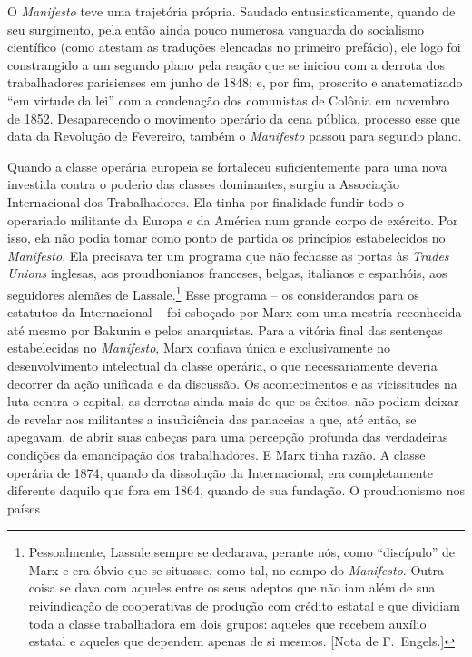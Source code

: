  O \textit{Manifesto} teve uma trajetória própria. Saudado
entusiasticamente, quando de seu surgimento, pela então ainda pouco
numerosa vanguarda do socialismo científico (como atestam as traduções
elencadas no primeiro prefácio), ele logo foi constrangido a um segundo
plano pela reação que se iniciou com a derrota dos trabalhadores
parisienses em junho de 1848; e, por fim, proscrito e anatematizado “em
virtude da lei” com a condenação dos comunistas de Colônia em novembro
de 1852. Desaparecendo o movimento operário da cena pública, processo
esse que data da Revolução de Fevereiro, também o \textit{Manifesto}
passou para segundo plano.

 Quando a classe operária europeia se fortaleceu suficientemente para
uma nova investida contra o poderio das classes dominantes, surgiu a
Associação Internacional dos Trabalhadores. Ela tinha por finalidade
fundir todo o operariado militante da Europa e da América num grande
corpo de exército. Por isso, ela não podia tomar como ponto de partida
os princípios estabelecidos no \textit{Manifesto}. Ela precisava ter um
programa que não fechasse as portas às \textit{Trades Unions} inglesas,
aos proudhonianos franceses, belgas, italianos e espanhóis, aos
seguidores alemães de Lassale.\footnote{ Pessoalmente, Lassale sempre se
declarava, perante nós, como “discípulo” de Marx e era óbvio que se
situasse, como tal, no campo do\textit{ Manifesto}. Outra coisa se dava
com aqueles entre os seus adeptos que não iam além de sua reivindicação
de cooperativas de produção com crédito estatal e que dividiam toda a
classe trabalhadora em dois grupos: aqueles que recebem auxílio estatal
e aqueles que dependem apenas de si mesmos. [Nota de F.~Engels.]}  Esse
programa – os considerandos para os estatutos da Internacional – foi
esboçado por Marx com uma mestria reconhecida até mesmo por Bakunin e
pelos anarquistas. Para a vitória final das sentenças estabelecidas no
\textit{Manifesto}, Marx confiava única e exclusivamente no
desenvolvimento intelectual da classe operária, o que necessariamente
deveria decorrer da ação unificada e da discussão. Os acontecimentos e
as vicissitudes na luta contra o capital, as derrotas ainda mais do que
os êxitos, não podiam deixar de revelar aos militantes a insuficiência
das panaceias a que, até então, se apegavam, de abrir suas cabeças para
uma percepção profunda das verdadeiras condições da emancipação dos
trabalhadores. E Marx tinha razão. A classe operária de 1874, quando da
dissolução da Internacional, era completamente diferente daquilo que
fora em 1864, quando de sua fundação. O proudhonismo nos países
